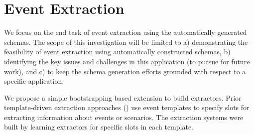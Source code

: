 \section{\label{sec:extraction} Event Extraction}

We focus on the end task of event extraction using the automatically generated schemas. The scope of this investigation will be limited to a) demonstrating the feasibility of event extraction using automatically constructed schemas, b) identifying the key issues and challenges in this application (to pursue for future work), and c) to keep the schema generation efforts grounded with respect to a specific application. 

We propose a simple bootstrapping based extension to build extractors. 
Prior template-driven extraction approaches (\cite{patwardhan-emnlp09}) use event templates to specify slots for extracting information about events or scenarios. The extraction systems were built by learning extractors for specific slots in each template. %

